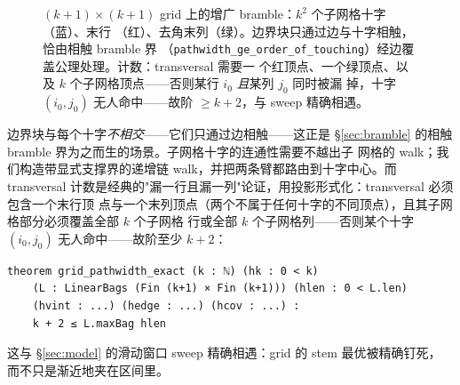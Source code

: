\documentclass[11pt]{ctexart}
\begin{document}
\begin{figure}[t]
\centering
{}
\caption{$(k{+}1)\times(k{+}1)$ grid 上的增广 bramble：$k^2$ 个子网格十字（蓝）、末行
（红）、去角末列（绿）。边界块只通过边与十字相触，恰由相触 bramble 界
（\texttt{pathwidth\_ge\_order\_of\_touching}）经边覆盖公理处理。计数：transversal 需要一
个红顶点、一个绿顶点、以及 $k$ 个子网格顶点——否则某行 $i_0$ \emph{且}某列 $j_0$ 同时被漏
掉，十字 $(i_0,j_0)$ 无人命中——故阶 $\ge k+2$，与 sweep 精确相遇。}
\label{fig:augmented}
\end{figure}

边界块与每个十字\emph{不相交}——它们只通过边相触——这正是
\S\ref{sec:bramble} 的相触 bramble 界为之而生的场景。子网格十字的连通性需要不越出子
网格的 walk；我们构造带显式支撑界的递增链 walk，并把两条臂都路由到十字中心。而
transversal 计数是经典的"漏一行且漏一列"论证，用投影形式化：transversal 必须包含一个末行顶
点与一个末列顶点（两个不属于任何十字的不同顶点），且其子网格部分必须覆盖全部 $k$ 个子网格
行或全部 $k$ 个子网格列——否则某个十字 $(i_0,j_0)$ 无人命中——故阶至少 $k+2$：

\begin{lstlisting}
theorem grid_pathwidth_exact (k : ℕ) (hk : 0 < k)
    (L : LinearBags (Fin (k+1) × Fin (k+1))) (hlen : 0 < L.len)
    (hvint : ...) (hedge : ...) (hcov : ...) :
    k + 2 ≤ L.maxBag hlen
\end{lstlisting}

\noindent 这与 \S\ref{sec:model} 的滑动窗口 sweep 精确相遇：grid 的 stem 最优被精确钉死，
而不只是渐近地夹在区间里。
\end{document}
